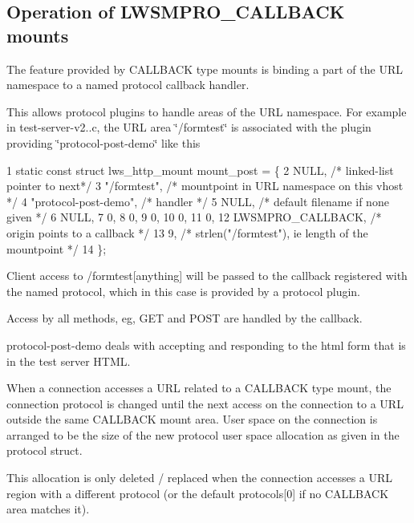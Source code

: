 \subsection*{Operation of L\+W\+S\+M\+P\+R\+O\+\_\+\+C\+A\+L\+L\+B\+A\+CK mounts }

The feature provided by C\+A\+L\+L\+B\+A\+CK type mounts is binding a part of the U\+RL namespace to a named protocol callback handler.

This allows protocol plugins to handle areas of the U\+RL namespace. For example in test-\/server-\/v2..\+c, the U\+RL area \char`\"{}/formtest\char`\"{} is associated with the plugin providing \char`\"{}protocol-\/post-\/demo\char`\"{} like this


\begin{DoxyCode}
1 static const struct lws\_http\_mount mount\_post = \{
2         NULL,           /* linked-list pointer to next*/
3         "/formtest",            /* mountpoint in URL namespace on this vhost */
4         "protocol-post-demo",   /* handler */
5         NULL,   /* default filename if none given */
6         NULL,
7         0,
8         0,
9         0,
10         0,
11         0,
12         LWSMPRO\_CALLBACK,       /* origin points to a callback */
13         9,                      /* strlen("/formtest"), ie length of the mountpoint */
14 \};
\end{DoxyCode}


Client access to /formtest\mbox{[}anything\mbox{]} will be passed to the callback registered with the named protocol, which in this case is provided by a protocol plugin.

Access by all methods, eg, G\+ET and P\+O\+ST are handled by the callback.

protocol-\/post-\/demo deals with accepting and responding to the html form that is in the test server H\+T\+ML.

When a connection accesses a U\+RL related to a C\+A\+L\+L\+B\+A\+CK type mount, the connection protocol is changed until the next access on the connection to a U\+RL outside the same C\+A\+L\+L\+B\+A\+CK mount area. User space on the connection is arranged to be the size of the new protocol user space allocation as given in the protocol struct.

This allocation is only deleted / replaced when the connection accesses a U\+RL region with a different protocol (or the default protocols\mbox{[}0\mbox{]} if no C\+A\+L\+L\+B\+A\+CK area matches it). 